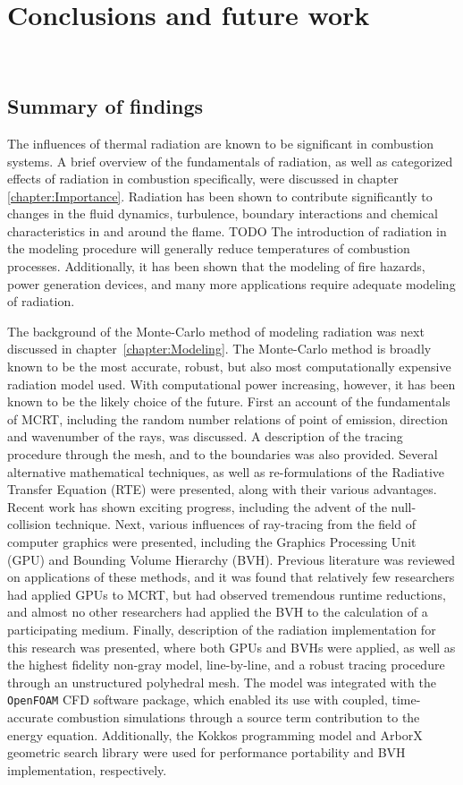 \addchapheadtotoc
\chapter{Conclusions and future work}~\label{chapter:conclusion}

\section{Summary of findings}
The influences of thermal radiation are known to be significant in combustion systems. A brief overview of the fundamentals of radiation, as well as categorized effects of radiation in combustion specifically, were discussed in chapter \ref{chapter:Importance}. 
Radiation has been shown to contribute significantly to changes in the fluid dynamics, turbulence, boundary interactions and chemical characteristics in and around the flame.
TODO
The introduction of radiation in the modeling procedure will generally reduce temperatures of combustion processes. 
Additionally, it has been shown that the modeling of fire hazards, power generation devices, and many more applications require adequate modeling of radiation. 

The background of the Monte-Carlo method of modeling radiation was next discussed in chapter~\ref{chapter:Modeling}. The Monte-Carlo method is broadly known to be the most accurate, robust, but also most computationally expensive radiation model used.
With computational power increasing, however, it has been known to be the likely choice of the future. First an account of the fundamentals of MCRT, including the random number relations of point of emission, direction and wavenumber of the rays, was discussed.
A description of the tracing procedure through the mesh, and to the boundaries was also provided.
Several alternative mathematical techniques, as well as re-formulations of the Radiative Transfer Equation (RTE) were presented, along with their various advantages. Recent work has shown exciting progress, including the advent of the null-collision technique. Next, various influences of ray-tracing from the field of computer graphics were presented, including the Graphics Processing Unit (GPU) and Bounding Volume Hierarchy (BVH).
Previous literature was reviewed on applications of these methods, and it was found that relatively few researchers had applied GPUs to MCRT, but had observed tremendous runtime reductions, and almost no other researchers had applied the BVH to the calculation of a participating medium.
Finally, description of the radiation implementation for this research was presented, where both GPUs and BVHs were applied, as well as the highest fidelity non-gray model, line-by-line, and a robust tracing procedure through an unstructured polyhedral mesh.
The model was integrated with the \verb|OpenFOAM| CFD software package, which enabled its use with coupled, time-accurate combustion simulations through a source term contribution to the energy equation. Additionally, the Kokkos programming model and ArborX geometric search library were used for performance portability and BVH implementation, respectively.

